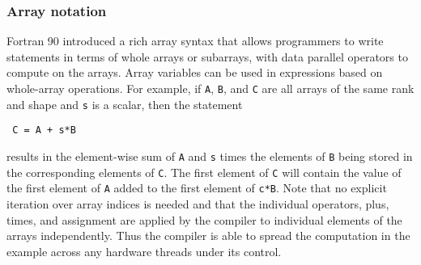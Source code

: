 \subsubsection*{Array notation}

Fortran 90 introduced a rich array syntax that allows programmers to
write statements in terms of whole arrays or subarrays, with
data parallel operators to compute on the arrays.
Array variables can be used in expressions
based on whole-array operations.  For example, if {\tt A}, {\tt B},
and {\tt C} are all arrays of the same rank and shape and {\tt s} is a
scalar, then the statement



{\small
\begin{verbatim}
 C = A + s*B
\end{verbatim}
}

\noindent results in the element-wise sum of {\tt A} and {\tt s} times
the elements of {\tt B} being stored in the corresponding elements of
{\tt C}. The first element of {\tt C} will contain the value of the
first element of {\tt A} added to the first element of {\tt c*B}.
Note that no explicit iteration over array indices is needed and that
the individual operators, plus, times, and assignment are applied by
the compiler to individual elements of the arrays independently.  Thus
the compiler is able to spread the computation in the example across
any hardware threads under its control.


